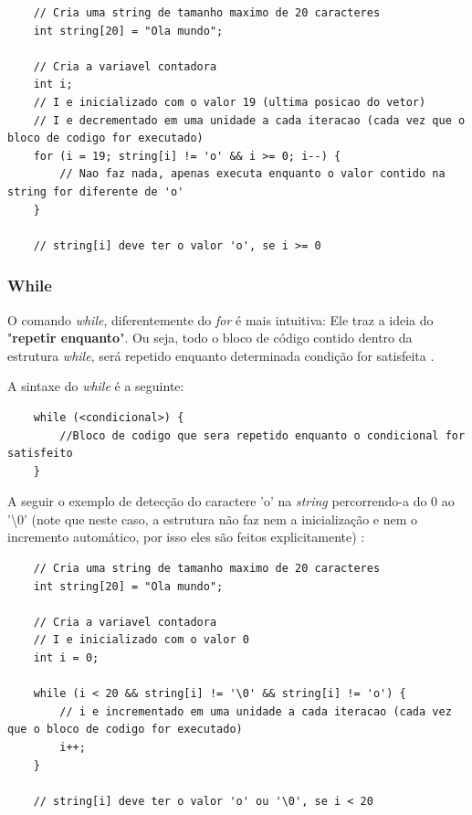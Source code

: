 \documentclass[12pt]{article}
\newcommand\tab[1][1cm]{\hspace*{#1}}
\begin{document}
\hspace{0.25cm}
\begin{lstlisting}
    // Cria uma string de tamanho maximo de 20 caracteres
    int string[20] = "Ola mundo";

    // Cria a variavel contadora
    int i;
    // I e inicializado com o valor 19 (ultima posicao do vetor)
    // I e decrementado em uma unidade a cada iteracao (cada vez que o bloco de codigo for executado)
    for (i = 19; string[i] != 'o' && i >= 0; i--) {
        // Nao faz nada, apenas executa enquanto o valor contido na string for diferente de 'o'
    }
    
    // string[i] deve ter o valor 'o', se i >= 0
\end{lstlisting}

\subsubsection{While}

\par\tab O comando \textit{while}, diferentemente do \textit{for} é mais intuitiva: Ele traz a ideia do "\textbf{repetir enquanto}". Ou seja, todo o bloco de código contido dentro da estrutura \textit{while}, será repetido enquanto determinada condição for satisfeita \cite{site:while}.

\par\tab A sintaxe do \textit{while} é a seguinte:

\hspace{0.25cm}
\begin{lstlisting}
    while (<condicional>) {
        //Bloco de codigo que sera repetido enquanto o condicional for satisfeito
    }
\end{lstlisting}

\par\tab A seguir o exemplo de detecção do caractere 'o' na \textit{string} percorrendo-a do 0 ao '\textbackslash 0' (note que neste caso, a estrutura não faz nem a inicialização e nem o incremento automático, por isso eles são feitos explicitamente) :

\hspace{0.25cm}
\begin{lstlisting}
    // Cria uma string de tamanho maximo de 20 caracteres
    int string[20] = "Ola mundo";

    // Cria a variavel contadora
    // I e inicializado com o valor 0
    int i = 0;
    
    while (i < 20 && string[i] != '\0' && string[i] != 'o') {
        // i e incrementado em uma unidade a cada iteracao (cada vez que o bloco de codigo for executado)
        i++;
    }
    
    // string[i] deve ter o valor 'o' ou '\0', se i < 20
\end{lstlisting}
\end{document}
